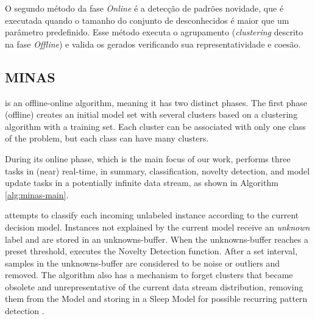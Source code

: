 O segundo método da fase \emph{Online} é a detecção de padrões novidade,
que é executada quando o tamanho do conjunto de desconhecidos é maior
que um parâmetro predefinido.
Esse método executa o agrupamento (\emph{clustering} descrito na fase
\emph{Offline}) e valida os \mclusters gerados verificando sua representatividade
e coesão.

\subsection{MINAS}
\label{sec:minas}

\minas \cite{Faria2015minas} is an offline-online \nd algorithm,
meaning it has two distinct phases. The first phase (offline) creates an initial
model set with several clusters based on a clustering algorithm with a training
set.
Each cluster can be associated with only one class of the problem, but each
class can have many clusters.

During its online phase, which is the main focus of our work, \minas performs
three tasks in (near) real-time,
in summary,
classification, novelty detection, and model update tasks
in a potentially infinite data stream, as shown in Algorithm \ref{alg:minas-main}.

\minas attempts to classify each incoming unlabeled instance according to the
current decision model. Instances not explained by the current model
receive an \textit{unknown} label and are stored in an unknowns-buffer.
When the unknowns-buffer reaches a preset threshold, \minas executes the
Novelty Detection function.
After a set interval, samples in the unknowns-buffer are considered to be
noise or outliers and removed.
The algorithm also has a mechanism to forget clusters that became obsolete and
unrepresentative of the current data stream distribution, removing them from
the Model and storing in a Sleep Model for possible recurring pattern
detection \cite{Faria2015minas}.

